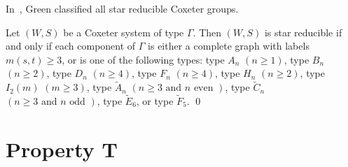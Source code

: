 In~\cite{Green2006a}, Green classified all star reducible Coxeter groups.

\begin{theorem}
	Let $(W,S)$ be a Coxeter system of type $\Gamma$. Then $(W,S)$ is star reducible if and only if each component of $\Gamma$ is either a complete graph with labels $m(s,t)\geq 3$, or is one of the following types: type $A_n$ $(n \geq 1)$, type $B_n$ $(n \geq 2)$, type $D_n$ $(n \geq 4)$, type $F_n$ $(n \geq 4)$, type $H_n$ $(n \geq 2)$, type $I_2(m)$ $(m \geq 3)$, type $\widetilde{A}_{n}$ $(n \geq 3 \textrm{ and } n \textrm{ even })$, type $\widetilde{C}_{n}$ $(n\geq 3 \textrm{ and } n \textrm{ odd })$, type $\widetilde{E}_6$, or type $\widetilde{F}_5$. \qed
\end{theorem}    


\section{Property T}\label{Tavoid}

